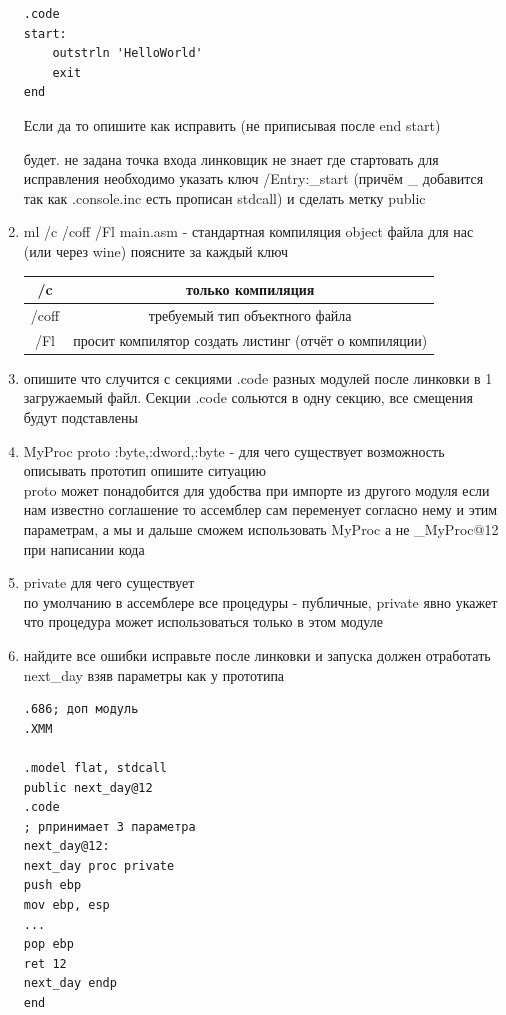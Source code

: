 \documentclass[a4paper,10pt]{article}
\begin{document}
\begin{enumerate}
\begin{verbatim}
.code
start: 
    outstrln 'HelloWorld'
    exit
end
\end{verbatim}
    Если да то опишите как исправить (не приписывая после end start) \par
    будет. не задана точка входа линковщик не знает где стартовать для исправления необходимо указать ключ /Entry:\_start (причём \_ добавится так как .console.inc есть прописан stdcall) и сделать метку public
    \item ml /c /coff /Fl main.asm - стандартная компиляция object файла для нас (или через wine) поясните за каждый ключ \\
    \begin{tabular*}{15cm}{c|c}
        \hline
        /c &  только компиляция \\
        \hline
        /coff & требуемый тип объектного файла \\
        \hline
        /Fl & просит компилятор создать листинг (отчёт о компиляции)\\
        \hline
    \end{tabular*}
    \item опишите что случится с секциями .code разных модулей после линковки в 1 загружаемый файл.
Секции .code сольются в одну секцию, все смещения будут подставлены\\
    \item MyProc proto :byte,:dword,:byte - для чего существует возможность описывать прототип опишите ситуацию \\
proto может понадобится для удобства при импорте из другого модуля если нам известно соглашение то ассемблер сам переменует согласно нему и этим параметрам, а мы и дальше сможем использовать MyProc а не \_MyProc@12 при написании кода \\
    \item private для чего существует \\
по умолчанию в ассемблере все процедуры - публичные, private явно укажет что процедура может использоваться только в этом модуле
    \item найдите все ошибки исправьте после линковки и запуска должен отработать next\_day взяв параметры как у прототипа
\begin{verbatim}
.686; доп модуль
.XMM

.model flat, stdcall
public next_day@12
.code
; рпринимает 3 параметра
next_day@12:
next_day proc private
push ebp
mov ebp, esp
...
pop ebp
ret 12
next_day endp
end
\end{verbatim}



\end{enumerate}
\end{document}
